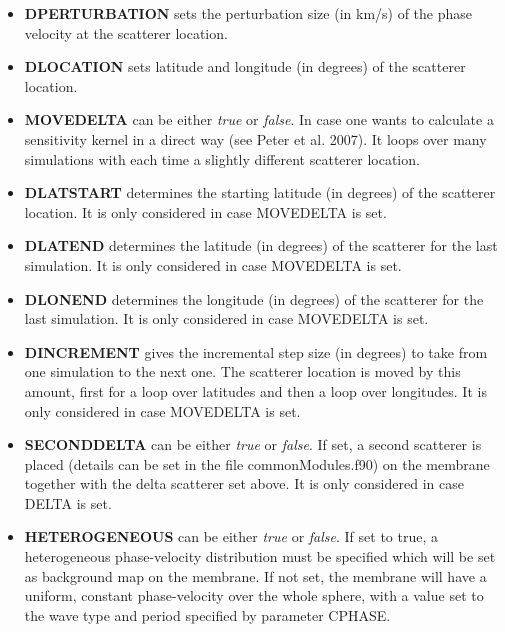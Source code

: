 \documentclass[a4paper,
                          headsepline,
                          listof=totoc,
                          toc=listof,
                          headings=small]{scrreprt} %
\begin{document}
\begin{itemize}
\item \textbf{DPERTURBATION}
sets the perturbation size (in km/s) of the phase velocity at the scatterer location.

\item \textbf{DLOCATION}
sets latitude and longitude (in degrees) of the scatterer location.


\item \textbf{MOVEDELTA}
can be either \textit{true} or \textit{false}. In case one wants to calculate a sensitivity kernel
in a direct way (see Peter et al. 2007). It loops over many simulations
with each time a slightly different scatterer location.

\item \textbf{DLATSTART}
determines the starting latitude (in degrees) of the scatterer location. It is only
considered in case MOVEDELTA is set.

\item \textbf{DLATEND}
determines the latitude (in degrees) of the scatterer for the last simulation. It is only considered in case MOVEDELTA is set.

\item \textbf{DLONEND}
determines the longitude (in degrees) of the scatterer for the last simulation. It is
only considered in case MOVEDELTA is set.

\item \textbf{DINCREMENT}
gives the incremental step size (in degrees) to take from one simulation
to the next one. The scatterer location is moved by this amount, first for a
loop over latitudes and then a loop over longitudes. It is only considered in case MOVEDELTA is set.

\item \textbf{SECONDDELTA}
can be either \textit{true} or \textit{false}. If set, a second scatterer is placed (details
can be set in the file commonModules.f90) on the membrane
together with the delta scatterer set above. It is only considered in case DELTA is set.



\item \textbf{HETEROGENEOUS}
can be either \textit{true} or \textit{false}. If set to true, a heterogeneous phase-velocity distribution must be specified which will be set as background map on the membrane.
If not set, the membrane will have a uniform, constant phase-velocity over the whole sphere, with a value set to the wave type and period specified by parameter CPHASE.


\end{itemize}
\end{document}
